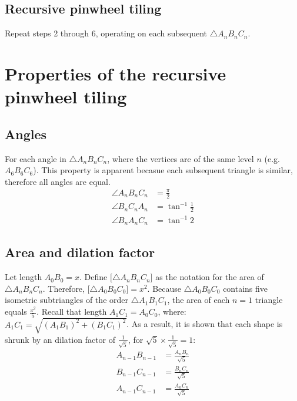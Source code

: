 

\subsection{Recursive pinwheel tiling}
Repeat steps 2 through 6, operating on each subsequent $\triangle A_{n}B_{n}C_{n}$.


\newpage



\section{Properties of the recursive pinwheel tiling}
\subsection{Angles}
For each angle in $\triangle A_{n}B_{n}C_{n}$, where the vertices are of the same level $n$ (e.g. \angle $A_{6}B_{6}C_{6}$). This property is apparent becasue each subsequent triangle is similar, therefore all angles are equal.
\begin{equation}
    \begin{aligned}
        \angle A_{n}B_{n}C_{n} &= \frac{\pi}{2} \\
        \angle B_{n}C_{n}A_{n} &= \tan^{-1}\frac{1}{2} \\
        \angle B_{n}A_{n}C_{n} &= \tan^{-1}2
    \end{aligned}
\end{equation}

\subsection{Area and dilation factor}
Let length $A_{0}B_{0} = x$. Define $\big[\triangle A_{n}B_{n}C_{n}\big]$ as the notation for the area of $\triangle A_{n}B_{n}C_{n}$. Therefore, $\big[\triangle A_{0}B_{0}C_{0}\big] = x^2$. Because $\triangle A_{0}B_{0}C_{0}$ contains five isometric subtriangles of the order $\triangle A_{1}B_{1}C_{1}$, the area of each $n = 1$ triangle equals $\frac{x^2}{5}$. Recall that length $A_{1}C_{1} = A_{0}C_{0}$, where: $A_{1}C_{1} = \sqrt{(A_{1}B_{1})^2 + (B_{1}C_{1})^2}$. As a result, it is shown that each shape is shrunk by an dilation factor of $\frac{1}{\sqrt{5}}$, for $\sqrt{5} \times \frac{1}{\sqrt{5}} = 1$:
\begin{equation}
    \begin{aligned}
        A_{n-1}B_{n-1} &= \frac{A_{n}B_{n}}{\sqrt{5}} \\
        B_{n-1}C_{n-1} &= \frac{B_{n}C_{n}}{\sqrt{5}} \\
        A_{n-1}C_{n-1} &= \frac{A_{n}C_{n}}{\sqrt{5}}
    \end{aligned}
\end{equation}

